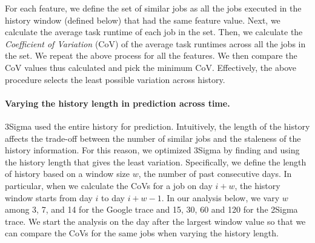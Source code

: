 For each feature, we define the set of similar jobs as
all the jobs executed in the history window
(defined below) that had the same feature value.
Next, we calculate the average task runtime of each job in the set. Then, we
calculate the {\em Coefficient of Variation} (CoV) of the average task runtimes
across all the jobs in the set. We repeat the above process for all the
features.  We then compare the CoV values thus calculated and pick the minimum
CoV.
Effectively, the above procedure selects the least possible variation
across history.

\paragraph{Varying the history length in prediction across time.}
3Sigma used the entire history for prediction.
Intuitively, the length of the history affects the trade-off between
the number of similar jobs and the staleness of the history information.
For this reason, we optimized 3Sigma
by finding and using the history length that gives the least variation.
Specifically, we define the length of history based
on a window size $w$, \ie the number of past consecutive days.
In particular, when we calculate the CoVs for a job on day $i+w$,
the history window starts from day $i$ to day $i+w-1$.
In our analysis below, we vary $w$ among 3, 7, and 14 for the Google trace and 15, 30, 60 and
120 for the 2Sigma trace.
\rm{We start the analysis on the day after the largest window value
  so that we can compare the CoVs for the same jobs when varying the history length.
  }


